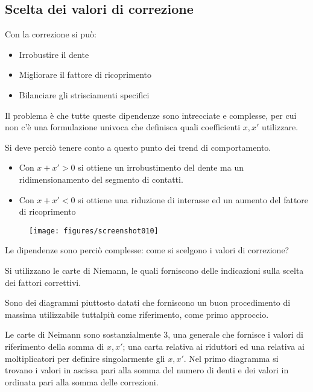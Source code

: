 \documentclass[a4paper, 15pt]{article}
\begin{document}
\subsection{Scelta dei valori di correzione}
\begin{adjustwidth}{2in}{}	
	Con la correzione si può: 
	\begin{itemize}
		\item Irrobustire il dente
		\item Migliorare il fattore di ricoprimento 
		\item Bilanciare gli strisciamenti specifici
	\end{itemize}
	Il problema è che tutte queste dipendenze sono intrecciate e complesse, per cui non c'è una formulazione  univoca che definisca quali coefficienti $x, x'$ utilizzare. \newline
	
	Si deve perciò tenere conto a questo punto dei trend di comportamento.	
	\begin{itemize}
		\item Con $x+x'>0$ si ottiene un irrobustimento del dente ma un ridimensionamento del segmento di contatti. 
		\item Con $x+x'<0$ si ottiene una riduzione di interasse ed un aumento del fattore di ricoprimento 
	\end{itemize} 	
	\begin{figure}[H]
		\centering
		\texttt{[image: figures/screenshot010]}
		\label{fig:screenshot010}
	\end{figure}
	Le dipendenze sono perciò complesse: come si scelgono i valori di correzione? \newline 
	
	Si utilizzano le carte di Niemann, le quali forniscono delle indicazioni sulla scelta dei fattori correttivi. 
	
	Sono dei diagrammi piuttosto datati che forniscono un buon procedimento di massima utilizzabile tuttalpiù come riferimento, come primo approccio. \newline 
	
	Le carte di Neimann sono sostanzialmente 3, una generale che fornisce i valori di riferimento della somma di $x, x'$; una carta relativa ai riduttori ed una relativa ai moltiplicatori per definire singolarmente gli $x, x'$.  
\newpage
Nel primo diagramma si trovano i valori in ascissa pari alla somma del numero di denti e dei valori  in ordinata pari alla somma delle correzioni. 


\end{adjustwidth}
\end{document}
